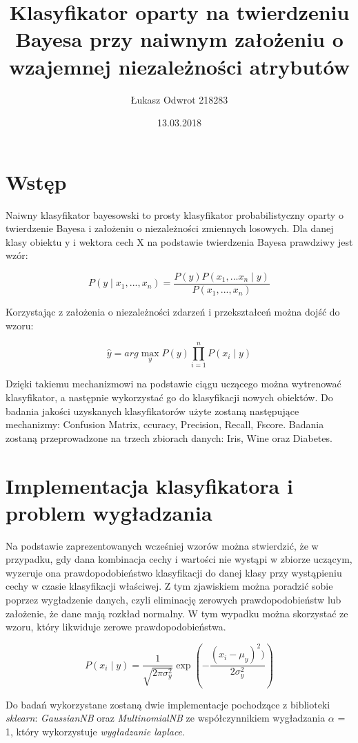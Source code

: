 \documentclass[12pt,a4paper]{article}
\title{Klasyfikator oparty na twierdzeniu Bayesa przy naiwnym założeniu o wzajemnej niezależności atrybutów}
\date{13.03.2018}
\author{Łukasz Odwrot 218283}
\begin{document}
\maketitle
\thispagestyle{empty}
\newpage
\tableofcontents
\setcounter{page}{1}
\newpage

\section{Wstęp}
Naiwny klasyfikator bayesowski to prosty klasyfikator probabilistyczny oparty o twierdzenie Bayesa i założeniu o niezależności zmiennych losowych.  Dla danej klasy obiektu y i wektora cech X na podstawie twierdzenia Bayesa prawdziwy jest wzór:


$$ P(y\mid x_{1},..., x_{n}) = 
\frac
{P(y)P(x_{1},...x_{n}\mid y)}
{P(x_{1},...,x_{n})}
$$

Korzystając z założenia o niezależności zdarzeń i przekształceń można dojść do wzoru:

$$  \hat{y} = arg \max_{y} P(y) \prod_{i=1}^{n} P(x_{i} \mid y) $$

Dzięki takiemu mechanizmowi na podstawie ciągu uczącego można wytrenować klasyfikator, a następnie wykorzystać go do klasyfikacji nowych obiektów. Do badania jakości uzyskanych klasyfikatorów użyte zostaną następujące mechanizmy: Confusion Matrix, ccuracy, Precision, Recall, Fscore. Badania zostaną przeprowadzone na trzech zbiorach danych: Iris, Wine oraz Diabetes.

\section{Implementacja klasyfikatora i problem wygładzania}

Na podstawie zaprezentowanych wcześniej wzorów można stwierdzić, że w przypadku, gdy dana kombinacja cechy  i wartości nie wystąpi w zbiorze uczącym, wyzeruje ona prawdopodobieństwo klasyfikacji do danej klasy przy wystąpieniu cechy w czasie klasyfikacji właściwej. Z tym zjawiskiem można poradzić sobie poprzez wygładzenie danych, czyli eliminację zerowych prawdopodobieństw lub założenie, że dane mają rozkład normalny. W tym wypadku można skorzystać ze wzoru, który likwiduje zerowe prawdopodobieństwa.

$$ 
P(x_{i} \mid y) = 
\frac
{1}
{\sqrt{2 \pi \sigma^{2}_{y}}}
\exp
(- 
\frac
{(x_{i} - \mu_{y})^2)}
{2\sigma^{2}_{y}}
)
$$

Do badań wykorzystane zostaną dwie implementacje pochodzące z biblioteki \emph{sklearn}: \emph{GaussianNB} oraz \emph{MultinomialNB} ze współczynnikiem wygładzania  $\alpha$ = 1, który wykorzystuje \emph{wygładzanie laplace}.
\end{document}

